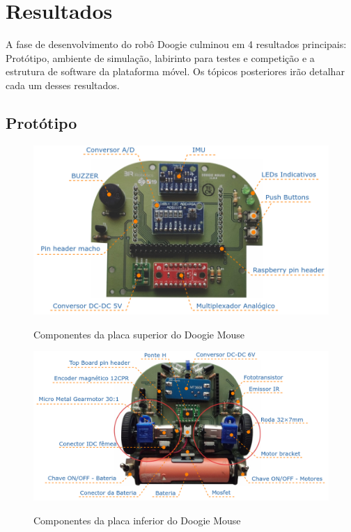 \chapter{Resultados}
\label{chap:resultados}
A fase de desenvolvimento do robô Doogie culminou em 4 resultados principais: Protótipo, ambiente de simulação, labirinto para testes e competição e a estrutura de software da plataforma móvel. Os tópicos posteriores irão detalhar cada um desses resultados. 

\section{Protótipo}
\label{sec:resultado_prototipo}

\begin{figure}[H]
	\centering
	\caption{Componentes da placa superior do Doogie Mouse}
	\includegraphics[width=1\textwidth]
	{Figures/top_board_elementos.png}
	\label{fig:top_board_elementos}
\end{figure}

\begin{figure}[H]
	\centering
	\caption{Componentes da placa inferior do Doogie Mouse}
	\includegraphics[width=1\textwidth]
	{Figures/bottom_board_elementos.png}
	\label{fig:bottom_board_elementos}
\end{figure}

